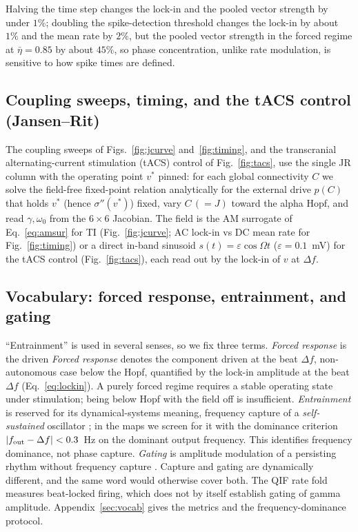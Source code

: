 \documentclass[11pt,a4paper]{article}
\newcommand{\Sig}{\sigma}
\providecommand{\DIFaddtex}[1]{{\protect\color{blue} \sf #1}} %
\providecommand{\DIFdeltex}[1]{{\protect\color{red} \scriptsize #1}} %
\providecommand{\DIFaddbegin}{} %
\providecommand{\DIFaddend}{} %
\providecommand{\DIFdelbegin}{} %
\providecommand{\DIFdelend}{} %
\providecommand{\DIFadd}[1]{\texorpdfstring{\DIFaddtex{#1}}{#1}} %
\providecommand{\DIFdel}[1]{\texorpdfstring{\DIFdeltex{#1}}{}} %
\begin{document}
Halving the time step changes the lock-in and the pooled vector
strength by under $1\%$; doubling the spike-detection threshold changes the lock-in by
about $1\%$ and the mean rate by $2\%$, but the pooled vector strength \DIFdelbegin \DIFdel{in the forced
regime }\DIFdelend \DIFaddbegin \DIFadd{at
$\bar\eta=0.85$ }\DIFaddend by about $45\%$, so phase concentration, unlike rate modulation, is sensitive to
how spike times are defined.

\subsection{Coupling sweeps, timing, and the tACS control (Jansen--Rit)}
The coupling sweeps of Figs.~\ref{fig:jcurve} and~\ref{fig:timing}, and the transcranial
alternating-current stimulation (tACS) control of Fig.~\ref{fig:tacs}, use the single JR
column with the operating point $v^*$ pinned: for
each global connectivity $C$ we solve the field-free fixed-point relation analytically
for the external drive $p(C)$ that holds $v^*$ (hence $\Sig''(v^*)$) fixed, vary $C\,(=J)$
toward the alpha Hopf, and read $\gamma,\omega_0$ from the $6\times6$ Jacobian. The field
is the AM surrogate of Eq.~\eqref{eq:amsur} for TI (Fig.~\ref{fig:jcurve}; AC lock-in vs DC mean
rate for Fig.~\ref{fig:timing}) or a direct in-band sinusoid $s(t)=\varepsilon\cos\Omega t$
($\varepsilon=0.1$~mV) for the tACS control (Fig.~\ref{fig:tacs}), each read out by the
lock-in of $v$ at $\Delta f$.

\subsection{Vocabulary: forced response, entrainment, and gating}
\DIFdelbegin \DIFdel{``Entrainment'' is used in several senses, so we fix three terms. \emph{Forced response} is the driven}\DIFdelend \DIFaddbegin \DIFadd{\emph{Forced response} denotes the component driven at the beat $\Delta f$}\DIFaddend ,
\DIFdelbegin \DIFdel{non-autonomous case below the Hopf, }\DIFdelend quantified by the lock-in amplitude \DIFdelbegin \DIFdel{at
the beat $\Delta f$ }\DIFdelend (Eq.~\eqref{eq:lockin}). \DIFaddbegin \DIFadd{A purely forced regime
requires a stable operating state under stimulation; being below Hopf with the field
off is insufficient. }\DIFaddend \emph{Entrainment} is reserved for its
dynamical-systems meaning, frequency capture of a \emph{self-sustained} oscillator
\cite{pikovsky2001}; in the maps we screen for it with the dominance criterion
$|f_{\rm out}-\Delta f|<0.3$~Hz on the dominant output frequency. This identifies
frequency dominance, not phase capture. \emph{Gating} is amplitude modulation of a persisting rhythm without
frequency capture \cite{canolty2010,tort2010}. Capture and gating are dynamically different, and the same word would otherwise cover
both. The QIF rate fold measures beat-locked firing, which does not by itself
establish gating of gamma amplitude. Appendix~\ref{sec:vocab} gives the metrics
and the frequency-dominance protocol.
\end{document}
